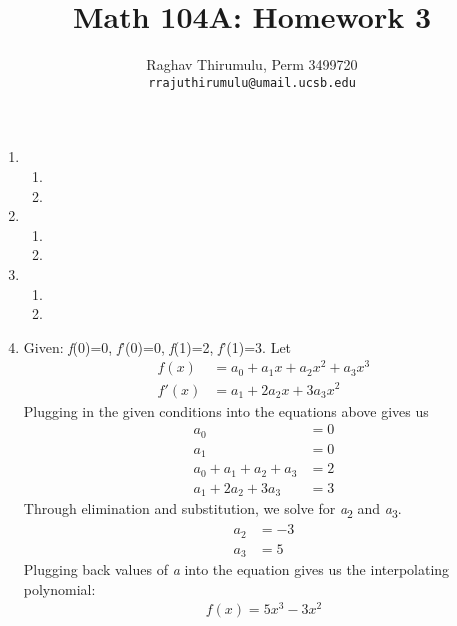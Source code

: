 \documentclass{article}
\begin{document}
\title{Math 104A: Homework 3}
\author{Raghav Thirumulu, Perm 3499720 \\ \texttt{rrajuthirumulu@umail.ucsb.edu}}
\maketitle

\begin{enumerate}
    \item %
        \begin{enumerate}
            \item %
            \item %
        \end{enumerate}
    \item %
        \begin{enumerate}
            \item %
            \item %
        \end{enumerate}
    \item %
        \begin{enumerate}
            \item %
            \item %
        \end{enumerate}
    \item %
        Given: \textit{f}(0)=0, \textit{f}'(0)=0, \textit{f}(1)=2, \textit{f}'(1)=3. Let 
        \begin{align*}
            f(x) &= a_{0} + a_{1}x + a_{2}x^2 + a_{3}x^3 \\
            f'(x) &= a_{1} + 2a_{2}x + 3a_{3}x^2 
        \end{align*}    
        Plugging in the given conditions into the equations above gives us
        \begin{align*}
            a_{0} &= 0 \\
            a_{1} &= 0 \\
            a_{0} + a_{1} + a_{2} + a_{3} &= 2 \\
            a_{1} + 2a_{2} + 3a_{3} &= 3 
        \end{align*}
        Through elimination and substitution, we solve for \textit{a}\textsubscript{2} and \textit{a}\textsubscript{3}.
        \begin{align*}
            a_{2} &= -3 \\
            a_{3} &= 5
        \end{align*}
        Plugging back values of \textit{a} into the equation gives us the interpolating polynomial:
        \begin{align*}
            f(x) = 5x^3 -3x^2
        \end{align*}

\end{enumerate}
\end{document}

